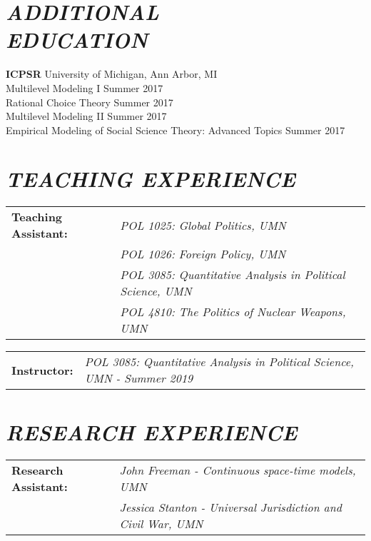 \documentclass[margin, 10pt]{res} %
\begin{document}
\begin{resume}
\section{\footnotesize \textit{ADDITIONAL\\EDUCATION}}
\textbf{ICPSR} University of Michigan, Ann Arbor, MI\\
\-\hspace{5mm} Multilevel Modeling I \hfill Summer 2017\\
\-\hspace{5mm} Rational Choice Theory \hfill Summer 2017\\
\-\hspace{5mm} Multilevel Modeling II \hfill Summer 2017\\
\-\hspace{5mm} Empirical Modeling of Social Science Theory: Advanced Topics \hfill Summer 2017


\section{\footnotesize \textit{TEACHING EXPERIENCE}}
\begin{tabular}{ll}
	\textbf{Teaching Assistant:}& \textit{POL 1025: Global Politics, UMN}\\
	&\textit{POL 1026: Foreign Policy, UMN}\\
	&\textit{POL 3085: Quantitative Analysis in Political Science, UMN}\\
	&\textit{POL 4810: The Politics of Nuclear Weapons, UMN} 
\end{tabular}
\begin{tabular}{ll}
	\textbf{Instructor:}& \textit{POL 3085: Quantitative Analysis in Political Science, UMN - Summer 2019}\\
\end{tabular}


\section{\footnotesize \textit{RESEARCH EXPERIENCE}}
\begin{tabular}{ll}
	\textbf{Research Assistant:}& \textit{John Freeman - Continuous space-time models, UMN}\\
	&\textit{Jessica Stanton - Universal Jurisdiction and Civil War, UMN}
\end{tabular}


\end{resume}
\end{document}
